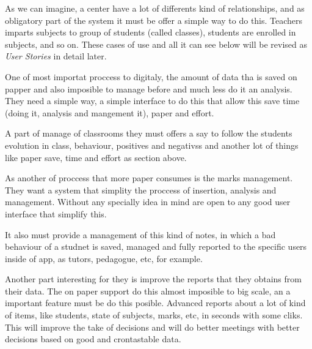 \documentclass[oneside,english,titlepage]{scrbook}
\begin{document}
\bigskip
{}
\bigskip

As we can imagine, a center have a lot of differents kind of relationships, and as obligatory part of the system it must be offer a simple way to do this. Teachers imparts subjects to group of students (called classes), students are enrolled in subjects, and so on. These cases of use and all it can see below will be revised as \textit{User Stories} in detail later.

\bigskip
{}
\bigskip

One of most importat proccess to digitaly, the amount of data tha is saved on papper and also imposible to manage before and much less do it an analysis.
They need a simple way, a simple interface to do this that allow this save time (doing it, analysis and mangement it), paper and effort. 


\bigskip
{}
\bigskip

A part of manage of classrooms they must offers a say to follow the students evolution in class, behaviour, positives and negativss and another lot of things like paper save, time and effort as section above.

\bigskip
{} %
\bigskip

As another of proccess that more paper consumes is the marks management. They want a system that simplity the proccess of insertion, analysis and management. Without any specially idea in mind are open to any good user interface that simplify this.


\bigskip
{}
\bigskip

It also must provide a management of this kind of notes, in which a bad behaviour of a studnet is saved, managed and fully reported to the specific users inside of app, as tutors, pedagogue, etc, for example.

\bigskip
{}
\bigskip

Another part interesting for they is improve the reports that they obtains from their data. The on paper support do this almost imposible to big scale, an a important feature must be do this posible. Advanced reports about a lot of kind of items, like students, state of subjects, marks, etc, in seconds with some cliks.
This will improve the take of decisions and will do better meetings with better decisions based on good and crontastable data.
\end{document}

